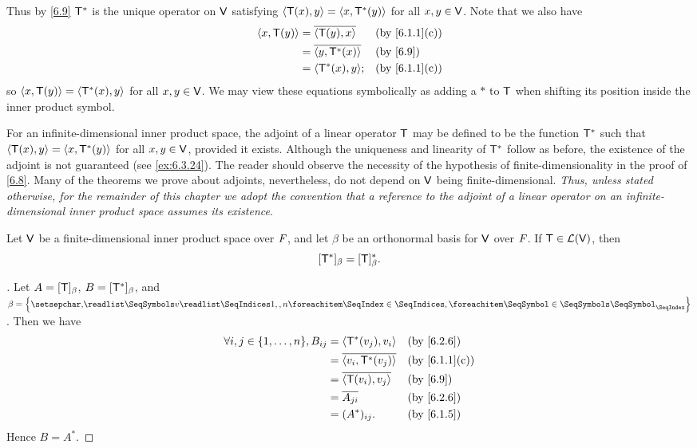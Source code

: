 \begin{note}
  Thus by \cref{6.9} \(\mathsf{T}^*\) is the unique operator on \(\mathsf{V}\) satisfying \(\left\langle\mathsf{T}(x), y\right\rangle = \left\langle x, \mathsf{T}^*(y)\right\rangle\) for all \(x, y \in \mathsf{V}\).
  Note that we also have
  \begin{align*}
    \inn{x, \T(y)} & = \conj{\inn{\T(y), x}}   &  & \text{(by \cref{6.1.1}(c))} \\
                   & = \conj{\inn{y, \T^*(x)}} &  & \text{(by \cref{6.9})}      \\
                   & = \inn{\T^*(x), y};       &  & \text{(by \cref{6.1.1}(c))}
  \end{align*}
  so \(\left\langle x, \mathsf{T}(y)\right\rangle = \left\langle\mathsf{T}^*(x), y\right\rangle\) for all \(x, y \in \mathsf{V}\).
  We may view these equations symbolically as adding a \(*\) to \(\mathsf{T}\) when shifting its position inside the inner product symbol.
\end{note}

\begin{note}
  For an infinite-dimensional inner product space, the adjoint of a linear operator \(\mathsf{T}\) may be defined to be the function \(\mathsf{T}^*\) such that \(\left\langle\mathsf{T}(x), y\right\rangle = \left\langle x, \mathsf{T}^*(y)\right\rangle\) for all \(x, y \in \mathsf{V}\), provided it exists.
  Although the uniqueness and linearity of \(\mathsf{T}^*\) follow as before, the existence of the adjoint is not guaranteed (see \cref{ex:6.3.24}).
  The reader should observe the necessity of the hypothesis of finite-dimensionality in the proof of \cref{6.8}.
  Many of the theorems we prove about adjoints, nevertheless, do not depend on \(\mathsf{V}\) being finite-dimensional.
  \emph{Thus, unless stated otherwise, for the remainder of this chapter we adopt the convention that a reference to the adjoint of a linear operator on an infinite-dimensional inner product space assumes its existence}.
\end{note}

\begin{thm}\label{6.10}
  Let \(\mathsf{V}\) be a finite-dimensional inner product space over \(\mathit{F}\), and let \(\beta\) be an orthonormal basis for \(\mathsf{V}\) over \(\mathit{F}\).
  If \(\mathsf{T} \in \mathcal{L}(\mathsf{V})\), then
  \[
    [\mathsf{T}^*]_{\beta} = [\mathsf{T}]_{\beta}^*.
  \]
\end{thm}

\begin{proof}[]
  Let \(A = [\mathsf{T}]_{\beta}\), \(B = [\mathsf{T}^*]_{\beta}\), and \(\beta = \set{\seq{v}{1,,n}}\).
  Then we have
  \begin{align*}
    \forall i, j \in \set{1, \dots, n}, B_{i j} & = \inn{\T^*(v_j), v_i}        &  & \text{(by \cref{6.2.6})}    \\
                                                & = \conj{\inn{v_i, \T^*(v_j)}} &  & \text{(by \cref{6.1.1}(c))} \\
                                                & = \conj{\inn{\T(v_i), v_j}}   &  & \text{(by \cref{6.9})}      \\
                                                & = \conj{A_{j i}}              &  & \text{(by \cref{6.2.6})}    \\
                                                & = (A^*)_{i j}.                &  & \text{(by \cref{6.1.5})}
  \end{align*}
  Hence \(B = A^*\).
\end{proof}

